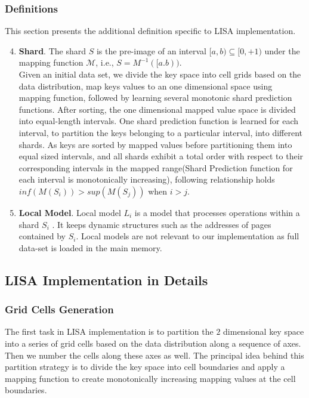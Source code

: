 \subsubsection{Definitions}

This section presents the additional definition specific to LISA implementation.

\begin{enumerate}
\setcounter{enumi}{3}
	\item \textbf{Shard}. The shard $S$ is the pre-image of an
interval $[a, b) \subseteq [0, +1)$ under the mapping function $\mathcal{M}$,  i.e., $S = M^{-1}([a.b))$. \\
Given an initial data set, we divide the key space into cell grids based on the data distribution, map keys values to an one dimensional space using mapping function, followed by learning several monotonic shard prediction functions. After sorting, the one dimensional mapped value space is divided into equal-length intervals. One shard prediction function is learned for each interval, to partition the keys belonging to a particular interval, into different shards. As keys are sorted by mapped values before partitioning them into equal sized intervals, and all shards exhibit a total order with respect to their corresponding intervals in the mapped range(Shard Prediction function for each interval is monotonically increasing), following relationship holds \\
$ inf (M(S_{i}))  > sup (M(S_{j}))$ when $i > j$.

\item \textbf{Local Model}. Local model $L_{i}$ is a model that processes operations within a shard $S_i$ . It keeps dynamic structures such as the addresses of pages contained by $S_{i}$. Local models are not relevant to our implementation as full data-set is loaded in the main memory.
\end{enumerate}

\subsection{LISA Implementation in Details}
\subsubsection{Grid Cells Generation}
The first task in LISA implementation is to partition the $2$ dimensional key space into a series of grid cells based on the data distribution along a sequence of axes. Then we number the cells along these axes as well. The principal idea behind this partition strategy is to divide the key space into cell boundaries and apply a mapping function to create monotonically increasing mapping values at the cell boundaries. 


